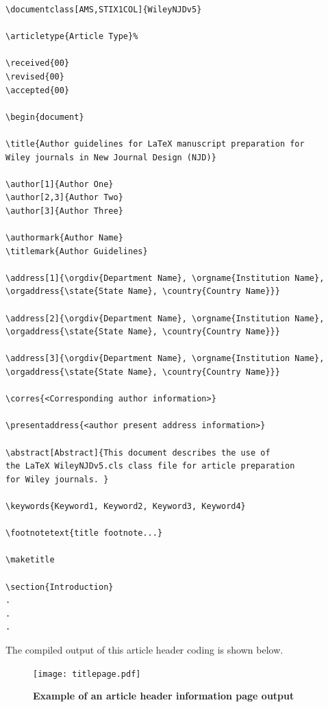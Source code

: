 \documentclass[11pt]{article}
\begin{document}
\begin{verbatim}
\documentclass[AMS,STIX1COL]{WileyNJDv5}

\articletype{Article Type}%

\received{00}
\revised{00}
\accepted{00}

\begin{document}

\title{Author guidelines for LaTeX manuscript preparation for
Wiley journals in New Journal Design (NJD)}

\author[1]{Author One}
\author[2,3]{Author Two}
\author[3]{Author Three}

\authormark{Author Name}
\titlemark{Author Guidelines}

\address[1]{\orgdiv{Department Name}, \orgname{Institution Name},
\orgaddress{\state{State Name}, \country{Country Name}}}

\address[2]{\orgdiv{Department Name}, \orgname{Institution Name},
\orgaddress{\state{State Name}, \country{Country Name}}}

\address[3]{\orgdiv{Department Name}, \orgname{Institution Name},
\orgaddress{\state{State Name}, \country{Country Name}}}

\corres{<Corresponding author information>}

\presentaddress{<author present address information>}

\abstract[Abstract]{This document describes the use of
the LaTeX WileyNJDv5.cls class file for article preparation
for Wiley journals. }

\keywords{Keyword1, Keyword2, Keyword3, Keyword4}

\footnotetext{title footnote...}

\maketitle

\section{Introduction}
.
.
.
\end{verbatim}
The compiled output of this article header coding is shown below.\vskip10pt

\begin{figure}[!h]
\vspace*{-20pt}
\centerline{\texttt{[image: titlepage.pdf]}}
\vskip10pt
\centerline{\bf Example of an article header information page output}
\vspace*{-10pt}
\end{figure}
\end{document}
